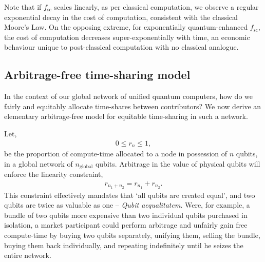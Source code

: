 Note that if $f_\text{sc}$ scales linearly, as per classical computation, we observe a regular exponential decay in the cost of computation, consistent with the classical Moore's Law. On the opposing extreme, for exponentially quantum-enhanced $f_\text{sc}$, the cost of computation decreases super-exponentially with time, an economic behaviour unique to post-classical computation with no classical analogue.

%
%

\subsection{Arbitrage-free time-sharing model}\label{sec:arb_free_time_share} 

In the context of our global network of unified quantum computers, how do we fairly and equitably allocate time-shares between contributors? We now derive an elementary arbitrage-free model for equitable time-sharing in such a network.

Let,
\begin{align}
	0\leq r_n \leq 1,
\end{align}
be the proportion of compute-time allocated to a node in possession of $n$ qubits, in a global network of $n_\text{global}$ qubits. Arbitrage in the value of physical qubits will enforce the linearity constraint,
\begin{align}
	r_{n_1+n_2} = r_{n_1} + r_{n_2}.
\end{align}
This constraint effectively mandates that `all qubits are created equal', and two qubits are twice as valuable as one -- \textit{Qubit aequalitatem}. Were, for example, a bundle of two qubits more expensive than two individual qubits purchased in isolation, a market participant could perform arbitrage and unfairly gain free compute-time by buying two qubits separately, unifying them, selling the bundle, buying them back individually, and repeating indefinitely until he seizes the entire network.

